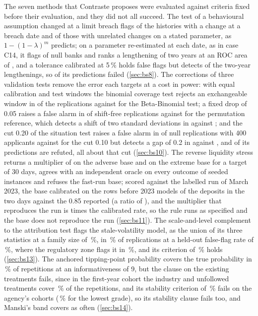 The seven methods that Contraste proposes were evaluated against criteria fixed before their evaluation, and they did not all succeed. The test of a behavioural assumption changed at a limit breach flags \pxPpEightStatedAlt{} of the histories with a change at a breach date and \pxPpEightStatedNull{} of those with unrelated changes on a stated parameter, as $1-(1-\lambda)^{m}$ predicts; on a parameter re-estimated at each date, as in case C14, it flags \pxPpEightFitNull{} of null banks and ranks a lengthening of two years at an ROC area of \pxPpEightFitAuc{}, and a tolerance calibrated at 5\,\% holds \pxPpEightTolNull{} false flags but detects \pxPpEightTolTwo{} of the two-year lengthenings, so \pxPpEightRefuted{} of its predictions failed (\cref{sec:bs8}). The corrections of three validation tests remove the error each targets at a cost in power: with equal calibration and test windows the binomial coverage test rejects an exchangeable window in \pxPpTenBinomEqual{} of the replications against \pxPpTenBetaBin{} for the Beta-Binomial test; a fixed drop of 0.05 raises a false alarm in \pxPpTenFixedFive{} of shift-free replications against \pxPpTenPerm{} for the permutation reference, which detects a shift of two standard deviations in \pxPpTenPermPower{} against \pxPpTenFixedPower{}; and the cut 0.20 of the situation test raises a false alarm in \pxPpTenCutTwenty{} of null replications with 400 applicants against \pxPpTenCutTen{} for the cut 0.10 but detects a gap of 0.2 in \pxPpTenPowTwentyGapTwo{} against \pxPpTenPowTenGapTwo{}, and \pxPpTenHypRefuted{} of its \pxPpTenHypTotal{} predictions are refuted, all about that cut (\cref{sec:bs10}). The reverse liquidity stress returns a multiplier of \pxPpElevenAdv{} on the adverse base and \pxPpElevenExt{} on the extreme base for a target of 30 days, agrees with an independent oracle on every outcome of \pxPpElevenInst{} seeded instances and refuses the fast-run base; scored against the labelled run of March 2023, the base calibrated on the rows before 2023 models \pxPpElevenSvbModel{} of the deposits in the two days against the 0.85 reported (a ratio of \pxPpElevenSvbRatio{}), and the multiplier that reproduces the run is \pxPpElevenSvbMult{} times the calibrated rate, so the rule runs as specified and the base does not reproduce the run (\cref{sec:bs11}). The scale-and-level complement to the attribution test flags the stale-volatility model, as the union of its three statistics at a family size of \pxThirteenSize{}\,\%, in \pxThirteenUnionPower{}\,\% of \pxThirteenN{} replications at a held-out false-flag rate of \pxThirteenNullUnion{}\,\%, where the regulatory zone flags it in \pxThirteenPla{}\,\%, and its criterion of \pxThirteenThresholdPower{}\,\% holds (\cref{sec:bs13}). The anchored tipping-point probability covers the true probability in \pxFourteenAnchoredNine{}\,\% of \pxFourteenReps{} repetitions at an informativeness of 9, but the clause on the existing treatments fails, since in the first-year cohort the industry and unfollowed treatments cover \pxFourteenIndustryNine{}\,\% of the repetitions, and its stability criterion of \pxFourteenStability{}\,\% fails on the agency's cohorts (\pxFourteenCccShare{}\,\% for the lowest grade), so its stability clause fails too, and Manski's band covers as often (\cref{sec:bs14}). 